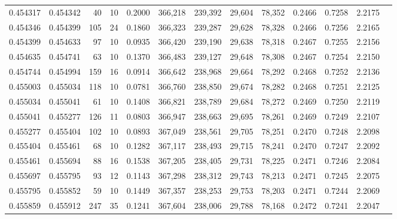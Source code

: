 \begin{tabular}{rrrrrrrrrrrrr}
0.454317 & 0.454342 &    40 &  10 &                                     0.2000 & 366,218 & 239,392 &  29,604 &  78,352 & 0.2466 & 0.7258 & 2.2175 \\
0.454346 & 0.454399 &   105 &  24 &                                     0.1860 & 366,323 & 239,287 &  29,628 &  78,328 & 0.2466 & 0.7256 & 2.2165 \\
0.454399 & 0.454633 &    97 &  10 &                                     0.0935 & 366,420 & 239,190 &  29,638 &  78,318 & 0.2467 & 0.7255 & 2.2156 \\
0.454635 & 0.454741 &    63 &  10 &                                     0.1370 & 366,483 & 239,127 &  29,648 &  78,308 & 0.2467 & 0.7254 & 2.2150 \\
0.454744 & 0.454994 &   159 &  16 &                                     0.0914 & 366,642 & 238,968 &  29,664 &  78,292 & 0.2468 & 0.7252 & 2.2136 \\
0.455003 & 0.455034 &   118 &  10 &                                     0.0781 & 366,760 & 238,850 &  29,674 &  78,282 & 0.2468 & 0.7251 & 2.2125 \\
0.455034 & 0.455041 &    61 &  10 &                                     0.1408 & 366,821 & 238,789 &  29,684 &  78,272 & 0.2469 & 0.7250 & 2.2119 \\
0.455041 & 0.455277 &   126 &  11 &                                     0.0803 & 366,947 & 238,663 &  29,695 &  78,261 & 0.2469 & 0.7249 & 2.2107 \\
0.455277 & 0.455404 &   102 &  10 &                                     0.0893 & 367,049 & 238,561 &  29,705 &  78,251 & 0.2470 & 0.7248 & 2.2098 \\
0.455404 & 0.455461 &    68 &  10 &                                     0.1282 & 367,117 & 238,493 &  29,715 &  78,241 & 0.2470 & 0.7247 & 2.2092 \\
0.455461 & 0.455694 &    88 &  16 &                                     0.1538 & 367,205 & 238,405 &  29,731 &  78,225 & 0.2471 & 0.7246 & 2.2084 \\
0.455697 & 0.455795 &    93 &  12 &                                     0.1143 & 367,298 & 238,312 &  29,743 &  78,213 & 0.2471 & 0.7245 & 2.2075 \\
0.455795 & 0.455852 &    59 &  10 &                                     0.1449 & 367,357 & 238,253 &  29,753 &  78,203 & 0.2471 & 0.7244 & 2.2069 \\
0.455859 & 0.455912 &   247 &  35 &                                     0.1241 & 367,604 & 238,006 &  29,788 &  78,168 & 0.2472 & 0.7241 & 2.2047 \\

\end{tabular}
